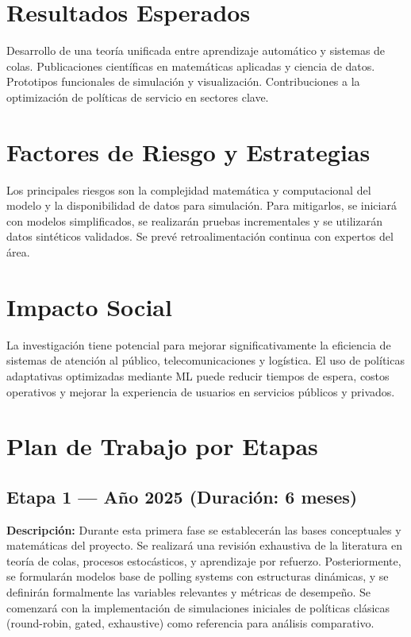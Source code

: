 \documentclass[12pt]{article}
\begin{document}
\section{Resultados Esperados}
Desarrollo de una teoría unificada entre aprendizaje automático y sistemas de colas. Publicaciones científicas en matemáticas aplicadas y ciencia de datos. Prototipos funcionales de simulación y visualización. Contribuciones a la optimización de políticas de servicio en sectores clave.

\section{Factores de Riesgo y Estrategias}
Los principales riesgos son la complejidad matemática y computacional del modelo y la disponibilidad de datos para simulación. Para mitigarlos, se iniciará con modelos simplificados, se realizarán pruebas incrementales y se utilizarán datos sintéticos validados. Se prevé retroalimentación continua con expertos del área.

\section{Impacto Social}
La investigación tiene potencial para mejorar significativamente la eficiencia de sistemas de atención al público, telecomunicaciones y logística. El uso de políticas adaptativas optimizadas mediante ML puede reducir tiempos de espera, costos operativos y mejorar la experiencia de usuarios en servicios públicos y privados.
\section{Plan de Trabajo por Etapas}

\subsection*{Etapa 1 — Año 2025 (Duración: 6 meses)}
\textbf{Descripción:} Durante esta primera fase se establecerán las bases conceptuales y matemáticas del proyecto. Se realizará una revisión exhaustiva de la literatura en teoría de colas, procesos estocásticos, y aprendizaje por refuerzo. Posteriormente, se formularán modelos base de polling systems con estructuras dinámicas, y se definirán formalmente las variables relevantes y métricas de desempeño. Se comenzará con la implementación de simulaciones iniciales de políticas clásicas (round-robin, gated, exhaustive) como referencia para análisis comparativo.
\end{document}
